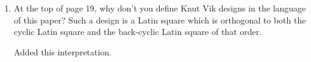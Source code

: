 \documentclass[12pt,a4paper]{article}
\newenvironment{QandA}{\begin{enumerate}[label=\bfseries\alph*.]\bfseries}
                      {\end{enumerate}}
\newenvironment{answered}{\par\normalfont}{}
\begin{document}
\begin{QandA}
\begin{answered}
We have removed two instances where the name of the set was not important, changed instances that are infinite sets but not index sets to~$J$ (albeit different sets in different parts of the section) and kept~$I$ for index sets. 
\end{answered}

\item At the top of page 19, why don't you define Knut Vik designs in the language of this paper? Such a design is a Latin square which is orthogonal to both the cyclic Latin square and the back-cyclic Latin square of that order.



\begin{answered}
Added this interpretation.
\end{answered}


\end{QandA}
\end{document}
